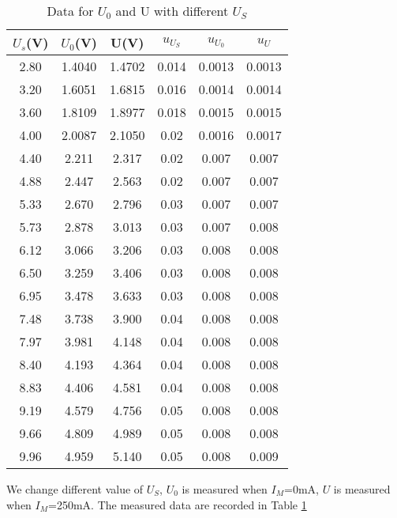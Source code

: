 \documentclass[12pt,a4paper]{article}
\begin{document}
\begin{table}[H]
    \centering
    \begin{tabular}{|c|c|c|c|c|c|}
    \hline
    $U_s$(V) & $U_0$(V) & U(V) & $u_{U_S}$ & $u_{U_0}$ & $u_U$ \\ \hline
    2.80 & 1.4040 & 1.4702 & 0.014 & 0.0013 & 0.0013 \\ \hline
    3.20 & 1.6051 & 1.6815 & 0.016 & 0.0014 & 0.0014 \\ \hline
    3.60 & 1.8109 & 1.8977 & 0.018 & 0.0015 & 0.0015 \\ \hline
    4.00 & 2.0087 & 2.1050 & 0.02  & 0.0016 & 0.0017 \\ \hline
    4.40 & 2.211  & 2.317  & 0.02  & 0.007  & 0.007  \\ \hline
    4.88 & 2.447  & 2.563  & 0.02  & 0.007  & 0.007  \\ \hline
    5.33 & 2.670  & 2.796  & 0.03  & 0.007  & 0.007  \\ \hline
    5.73 & 2.878  & 3.013  & 0.03  & 0.007  & 0.008  \\ \hline
    6.12 & 3.066  & 3.206  & 0.03  & 0.008  & 0.008  \\ \hline
    6.50 & 3.259  & 3.406  & 0.03  & 0.008  & 0.008  \\ \hline
    6.95 & 3.478  & 3.633  & 0.03  & 0.008  & 0.008  \\ \hline
    7.48 & 3.738  & 3.900  & 0.04  & 0.008  & 0.008  \\ \hline
    7.97 & 3.981  & 4.148  & 0.04  & 0.008  & 0.008  \\ \hline
    8.40 & 4.193  & 4.364  & 0.04  & 0.008  & 0.008  \\ \hline
    8.83 & 4.406  & 4.581  & 0.04  & 0.008  & 0.008  \\ \hline
    9.19 & 4.579  & 4.756  & 0.05  & 0.008  & 0.008  \\ \hline
    9.66 & 4.809  & 4.989  & 0.05  & 0.008  & 0.008  \\ \hline
    9.96 & 4.959  & 5.140  & 0.05  & 0.008  & 0.009  \\ \hline
    \end{tabular}
    \caption{Data for $U_0$ and U with different $U_S$}
    \label{u0usu}
\end{table}

We change different value of $U_S$, $U_0$ is measured when $I_M$=0mA, $U$ is measured when $I_M$=250mA. The measured data are recorded in Table \ref{u0usu}
\end{document}

